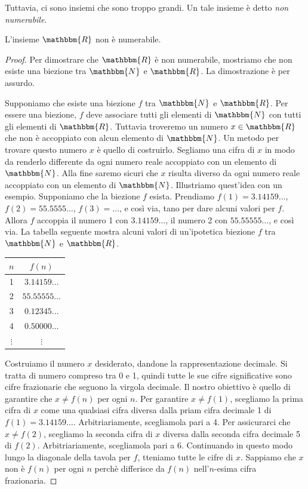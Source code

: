 \documentclass[12pt]{report}
\newcounter{theorem}
\begin{document}
Tuttavia, ci sono insiemi che sono troppo grandi. Un tale insieme è detto \textit{non numerabile}.
\begin{theorem}{}{}
	L'insieme $\mathbbm{R}$ non è numerabile.
\end{theorem}
\begin{proof} Per dimostrare che $\mathbbm{R}$ è non numerabile, mostriamo che non esiste una biezione tra $\mathbbm{N}$ e $\mathbbm{R}$. La dimostrazione è per assurdo.

Supponiamo che esiste una biezione $f$ tra $\mathbbm{N}$ e $\mathbbm{R}$. Per essere una biezione, $f$ deve associare tutti gli elementi di $\mathbbm{N}$ con tutti gli elementi di $\mathbbm{R}$. Tuttavia troveremo un numero $x \in \mathbbm{R}$ che non è accoppiato con alcun elemento di $\mathbbm{N}$. Un metodo per trovare questo numero $x$ è quello di costruirlo. Segliamo una cifra di $x$ in modo da renderlo differente da ogni numero reale accoppiato con un elemento di $\mathbbm{N}$. Alla fine saremo sicuri che $x$ risulta diverso da ogni numero reale accoppiato con un elemento di $\mathbbm{N}$. Illustriamo quest'idea con un esempio. Supponiamo che la biezione $f$ esista. Prendiamo $f(1) = 3.14159\dots$, $f(2) = 55.5555\dots$, $f(3)=\dots$, e così via, tano per dare alcuni valori per $f$. Allora $f$ accoppia il numero 1 con $3.14159\dots$, il numero 2 con $55.55555\dots$, e così via. La tabella seguente mostra alcuni valori di un'ipotetica biezione $f$ tra $\mathbbm{N}$ e $\mathbbm{R}$.
\begin{table}[H]
\centering
\begin{tabular}{c|c}
$n$ & $f(n)$ \\
\hline
1 & $3.14159\ldots$ \\
2 & $55.55555\ldots$ \\
3 & $0.12345\ldots$ \\
4 & $0.50000\ldots$ \\
$\vdots$ & $\vdots$ \\
\end{tabular}
\end{table}
Costruiamo il numero $x$ desiderato, dandone la rappresentazione decimale. Si tratta di numero compreso tra 0 e 1, quindi tutte le sue cifre significative sono cifre frazionarie che seguono la virgola decimale. Il nostro obiettivo è quello di garantire che $x \neq f(n)$ per ogni $n$. Per garantire $x \neq f(1)$, scegliamo la prima cifra di $x$ come una qualsiasi cifra diversa dalla priam cifra decimale 1 di $f(1) = 3.14159\dots$. Arbitriariamente, scegliamola pari a 4. Per assicurarci che $x \neq f(2)$, scegliamo la seconda cifra di $x$ diversa dalla seconda cifra decimale 5 di $f(2)$. Arbitriariamente, scegliamola pari a 6. Continuando in questo modo lungo la diagonale della tavola per $f$, tteniamo tutte le cifre di $x$. Sappiamo che $x$ non è $f(n)$ per ogni $n$ perchè differisce da $f(n)$ nell'$n$-esima cifra frazionaria.
\end{proof}
\end{document}
